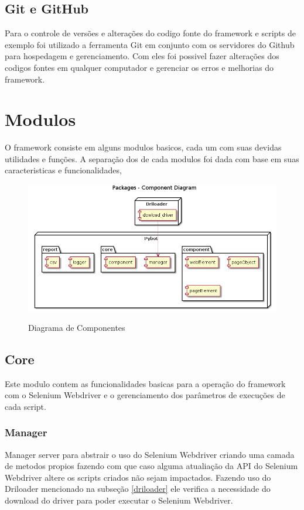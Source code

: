         \subsection{Git e GitHub}
            Para o controle de versões e alterações do codigo fonte do framework e scripts de exemplo foi utilizado a ferramenta
            Git \cite{git} em conjunto com os servidores do Github \cite{github} para hospedagem e gerenciamento. Com eles foi possivel
            fazer alterações dos codigos fontes em qualquer computador e gerenciar os erros e melhorias do framework.


    \section{Modulos}

        O framework consiste em alguns modulos basicos, cada um com suas devidas utilidades e funções.
        A separação dos de cada modulos foi dada com base em suas caracteristicas e funcionalidades,

        \begin{figure}[H]
            \vspace*{0,3cm}
            \centering
            \caption{Diagrama de Componentes}
            \includegraphics[width=1\textwidth]{./04-figuras/model}
            \label{fig:modules}
        \end{figure}

        \subsection{Core}
            Este modulo contem as funcionalidades basicas para a operação do framework com o Selenium Webdriver
            e o gerenciamento dos parâmetros de execuções de cada script.

            \subsubsection{Manager}
            Manager server para abstrair o uso do Selenium Webdriver criando uma camada de metodos propios fazendo com que caso alguma
            atualiação da API do Selenium Webdriver altere os scripts criados não sejam impactados. Fazendo uso do Driloader mencionado na
            subseção \ref{driloader} ele verifica a necessidade do download do driver para poder executar o Selenium Webdriver.


